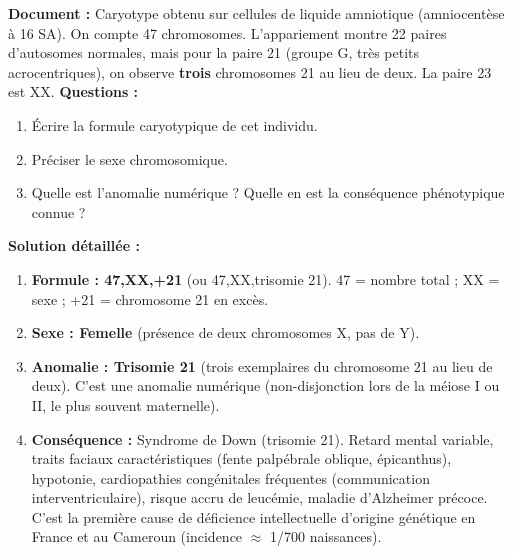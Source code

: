 \documentclass[11pt]{article}
\begin{document}
\begin{exoresolu}
\textbf{Document :} Caryotype obtenu sur cellules de liquide amniotique (amniocentèse à 16 SA). On compte 47 chromosomes. L'appariement montre 22 paires d'autosomes normales, mais pour la paire 21 (groupe G, très petits acrocentriques), on observe \textbf{trois} chromosomes 21 au lieu de deux. La paire 23 est XX.
\textbf{Questions :}
\begin{enumerate}
    \item Écrire la formule caryotypique de cet individu.
    \item Préciser le sexe chromosomique.
    \item Quelle est l'anomalie numérique ? Quelle en est la conséquence phénotypique connue ?
\end{enumerate}
\tcblower
\textbf{Solution détaillée :}
\begin{enumerate}
    \item \textbf{Formule : 47,XX,+21} (ou 47,XX,trisomie 21). 47 = nombre total ; XX = sexe ; +21 = chromosome 21 en excès.
    \item \textbf{Sexe : Femelle} (présence de deux chromosomes X, pas de Y).
    \item \textbf{Anomalie : Trisomie 21} (trois exemplaires du chromosome 21 au lieu de deux). C'est une anomalie numérique (non-disjonction lors de la méiose I ou II, le plus souvent maternelle).
    \item \textbf{Conséquence :} Syndrome de Down (trisomie 21). Retard mental variable, traits faciaux caractéristiques (fente palpébrale oblique, épicanthus), hypotonie, cardiopathies congénitales fréquentes (communication interventriculaire), risque accru de leucémie, maladie d'Alzheimer précoce. C'est la première cause de déficience intellectuelle d'origine génétique en France et au Cameroun (incidence $\approx$ 1/700 naissances).
\end{enumerate}
\end{exoresolu}
\end{document}

